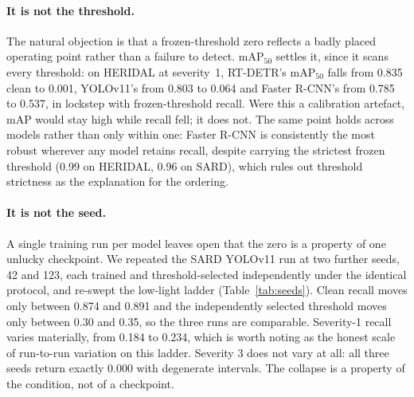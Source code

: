 \paragraph{It is not the threshold.} The natural objection is that a
frozen-threshold zero reflects a badly placed operating point rather
than a failure to detect. mAP$_{50}$ settles it, since it scans every
threshold: on HERIDAL at severity~1, RT-DETR's mAP$_{50}$ falls from
0.835 clean to 0.001, YOLOv11's from 0.803 to 0.064 and Faster R-CNN's
from 0.785 to 0.537, in lockstep with frozen-threshold recall. Were this
a calibration artefact, mAP would stay high while recall fell; it does
not. The same point holds across models rather than only within one:
Faster R-CNN is consistently the most robust wherever any model retains
recall, despite carrying the strictest frozen threshold (0.99 on
HERIDAL, 0.96 on SARD), which rules out threshold strictness as the
explanation for the ordering.

\paragraph{It is not the seed.} A single training run per model leaves
open that the zero is a property of one unlucky checkpoint. We repeated
the SARD YOLOv11 run at two further seeds, 42 and 123, each trained and
threshold-selected independently under the identical protocol, and
re-swept the low-light ladder (Table~\ref{tab:seeds}). Clean recall
moves only between 0.874 and 0.891 and the independently selected
threshold moves only between 0.30 and 0.35, so the three runs are
comparable. Severity-1 recall varies materially, from 0.184 to 0.234,
which is worth noting as the honest scale of run-to-run variation on
this ladder. Severity 3 does not vary at all: all three seeds return
exactly 0.000 with degenerate intervals. The collapse is a property of
the condition, not of a checkpoint.

